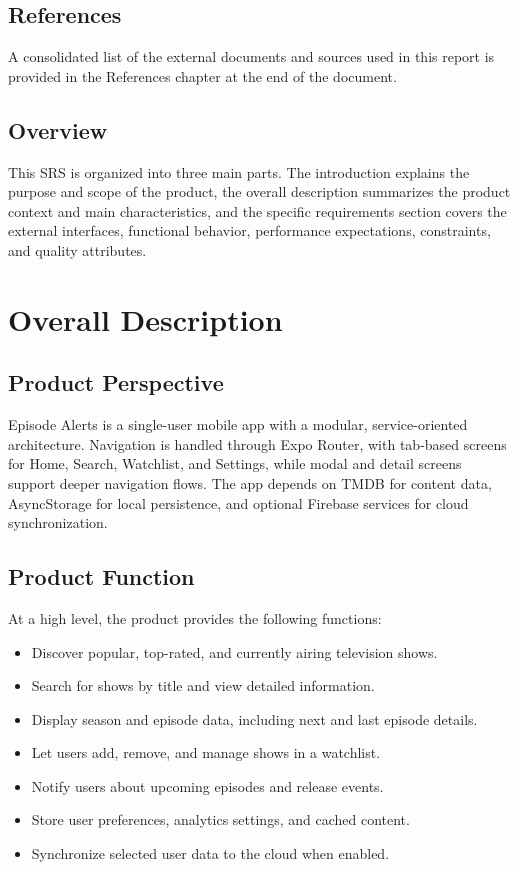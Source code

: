 \subsection{References}
A consolidated list of the external documents and sources used in this report is provided in the References chapter at the end of the document.

\subsection{Overview}
This SRS is organized into three main parts. The introduction explains the purpose and scope of the product, the overall description summarizes the product context and main characteristics, and the specific requirements section covers the external interfaces, functional behavior, performance expectations, constraints, and quality attributes.

\section{Overall Description}

\subsection{Product Perspective}
Episode Alerts is a single-user mobile app with a modular, service-oriented architecture. Navigation is handled through Expo Router, with tab-based screens for Home, Search, Watchlist, and Settings, while modal and detail screens support deeper navigation flows. The app depends on TMDB for content data, AsyncStorage for local persistence, and optional Firebase services for cloud synchronization.

\subsection{Product Function}
At a high level, the product provides the following functions:
\begin{itemize}
	\item Discover popular, top-rated, and currently airing television shows.
	\item Search for shows by title and view detailed information.
	\item Display season and episode data, including next and last episode details.
	\item Let users add, remove, and manage shows in a watchlist.
	\item Notify users about upcoming episodes and release events.
	\item Store user preferences, analytics settings, and cached content.
	\item Synchronize selected user data to the cloud when enabled.
\end{itemize}

